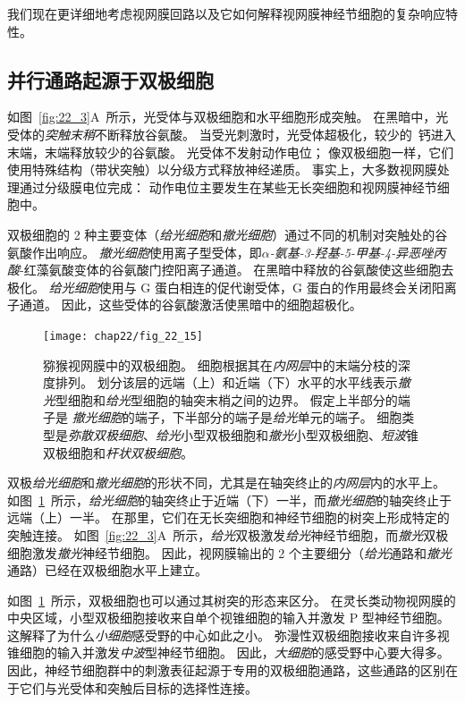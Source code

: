 我们现在更详细地考虑视网膜回路以及它如何解释视网膜神经节细胞的复杂响应特性。


\subsection{并行通路起源于双极细胞}

如图~\ref{fig:22_3}A~所示，光受体与双极细胞和水平细胞形成突触。
在黑暗中，光受体的\textit{突触末稍}不断释放谷氨酸。
当受光刺激时，光受体超极化，较少的~钙进入末端，末端释放较少的谷氨酸。
光受体不发射动作电位；
像双极细胞一样，它们使用特殊结构（带状突触）以分级方式释放神经递质。
事实上，大多数视网膜处理通过分级膜电位完成：
动作电位主要发生在某些无长突细胞和视网膜神经节细胞中。


双极细胞的 2 种主要变体（\textit{给光细胞}和\textit{撤光细胞}）通过不同的机制对突触处的谷氨酸作出响应。
\textit{撤光细胞}使用离子型受体，即\textit{$\alpha$-氨基-3-羟基-5-甲基-4-异恶唑丙酸}-红藻氨酸变体的谷氨酸门控阳离子通道。
在黑暗中释放的谷氨酸使这些细胞去极化。
\textit{给光细胞}使用与 G 蛋白相连的促代谢受体，G 蛋白的作用最终会关闭阳离子通道。
因此，这些受体的谷氨酸激活使黑暗中的细胞超极化。


\begin{figure}[htbp]
	\centering
	\texttt{[image: chap22/fig\_22\_15]}
	\caption{猕猴视网膜中的双极细胞。
		细胞根据其在\textit{内网层}中的末端分枝的深度排列。
		划分该层的远端（上）和近端（下）水平的水平线表示\textit{撤光}型细胞和\textit{给光}型细胞的轴突末梢之间的边界。
		假定上半部分的端子是 \textit{撤光细胞}的端子，下半部分的端子是\textit{给光}单元的端子。
		细胞类型是\textit{弥散双极细胞}、\textit{给光}小型双极细胞和\textit{撤光}小型双极细胞、\textit{短波}锥双极细胞和\textit{杆状双极细胞}。}
	\label{fig:22_15}
\end{figure}


双极\textit{给光细胞}和\textit{撤光细胞}的形状不同，尤其是在轴突终止的\textit{内网层}内的水平上。
如图~\ref{fig:22_15}~所示，\textit{给光细胞}的轴突终止于近端（下）一半，而\textit{撤光细胞}的轴突终止于远端（上）一半。
在那里，它们在无长突细胞和神经节细胞的树突上形成特定的突触连接。
如图~\ref{fig:22_3}A~所示，\textit{给光}双极激发\textit{给光}神经节细胞，而\textit{撤光}双极细胞激发\textit{撤光}神经节细胞。
因此，视网膜输出的 2 个主要细分（\textit{给光}通路和\textit{撤光}通路）已经在双极细胞水平上建立。


如图~\ref{fig:22_15}~所示，双极细胞也可以通过其树突的形态来区分。
在灵长类动物视网膜的中央区域，小型双极细胞接收来自单个视锥细胞的输入并激发 P 型神经节细胞。
这解释了为什么\textit{小细胞}感受野的中心如此之小。
弥漫性双极细胞接收来自许多视锥细胞的输入并激发\textit{中波}型神经节细胞。
因此，\textit{大细胞}的感受野中心要大得多。
因此，神经节细胞群中的刺激表征起源于专用的双极细胞通路，这些通路的区别在于它们与光受体和突触后目标的选择性连接。



